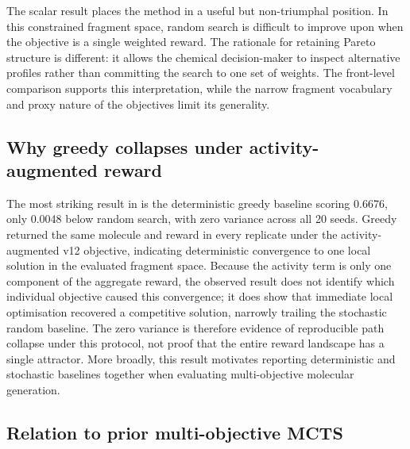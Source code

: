 \documentclass[10pt,a4paper]{article}
\begin{document}
The scalar result places the method in a useful but non-triumphal position. In this constrained fragment space, random search is difficult to improve upon when the objective is a single weighted reward. The rationale for retaining Pareto structure is different: it allows the chemical decision-maker to inspect alternative profiles rather than committing the search to one set of weights. The front-level comparison supports this interpretation, while the narrow fragment vocabulary and proxy nature of the objectives limit its generality.

\subsection{Why greedy collapses under activity-augmented reward}

The most striking result in  is the deterministic greedy baseline scoring \num{0.6676}, only \num{0.0048} below random search, with zero variance across all \num{20} seeds. Greedy returned the same molecule and reward in every replicate under the activity-augmented v12 objective, indicating deterministic convergence to one local solution in the evaluated fragment space. Because the activity term is only one component of the aggregate reward, the observed result does not identify which individual objective caused this convergence; it does show that immediate local optimisation recovered a competitive solution, narrowly trailing the stochastic random baseline. The zero variance is therefore evidence of reproducible path collapse under this protocol, not proof that the entire reward landscape has a single attractor. More broadly, this result motivates reporting deterministic and stochastic baselines together when evaluating multi-objective molecular generation.

\subsection{Relation to prior multi-objective MCTS}
\end{document}
